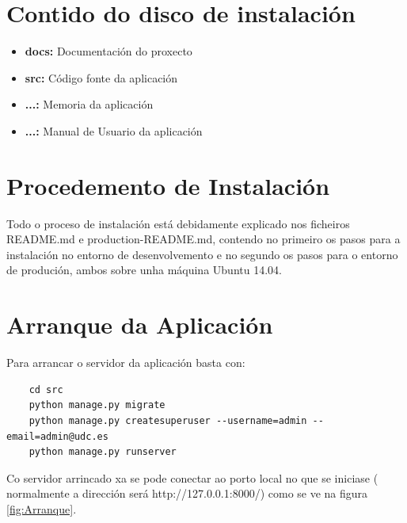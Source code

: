 \documentclass[11pt, a4paper, twoside, titlepage]{book}
\begin{document}
    \section{Contido do disco de instalación}
        \begin{itemize}
         \item \textbf{docs:} Documentación do proxecto
         \item \textbf{src:} Código fonte da aplicación
         \item \textbf{...:} Memoria da aplicación
         \item \textbf{...:} Manual de Usuario da aplicación
        \end{itemize}

    
    \section{Procedemento de Instalación}
        Todo o proceso de instalación está debidamente explicado nos ficheiros README.md
        e production-README.md, contendo no primeiro os pasos para a instalación no entorno
        de desenvolvemento e no segundo os pasos para o entorno de produción, ambos sobre unha
        máquina Ubuntu 14.04.
        
    \section{Arranque da Aplicación}
        Para arrancar o servidor da aplicación basta con:
        
        \begin{verbatim}
    cd src
    python manage.py migrate
    python manage.py createsuperuser --username=admin --email=admin@udc.es
    python manage.py runserver
        \end{verbatim}

        Co servidor arrincado xa se pode conectar ao porto local no que se iniciase ( normalmente 
        a dirección será http://127.0.0.1:8000/) como se ve na figura \ref{fig:Arranque}.
        
\end{document}
